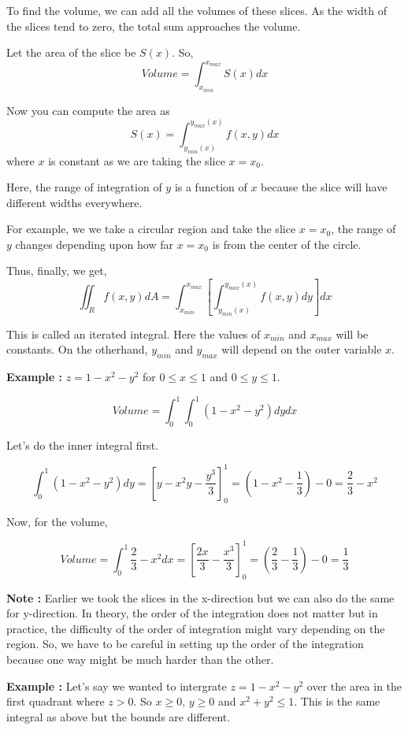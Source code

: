 To find the volume, we can add all the volumes of these slices.
As the width of the slices tend to zero, the total sum approaches the volume.

Let the area of the slice be $S(x)$. So, $$ Volume =  \int_{x_{min}}^{x_{max}} S(x) dx $$

Now you can compute the area as $$ S(x) = \int_{y_{min}(x)}^{y_{max}(x)} f(x, y) dx $$ where $x$ is constant as we are taking the slice $x = x_0$.

Here, the range of integration of $y$ is a function of $x$ because the slice will have different widths everywhere.

For example, we we take a circular region and take the slice $x = x_0$, the range of $y$ changes depending upon how far $x = x_0$ is from the center of the circle.

Thus, finally, we get,
$$ \iint_R f(x, y) dA = \int_{x_{min}}^{x_{max}} \left[ \int_{y_{min}(x)}^{y_{max}(x)} f(x, y) dy  \right] dx $$

This is called an iterated integral. Here the values of $x_{min}$ and $x_{max}$ will be constants.
On the otherhand, $y_{min}$ and $y_{max}$ will depend on the outer variable $x$.


{\bf Example : } $z = 1 - x^2 - y^2$ for $0 \leq x \leq 1$ and $0 \leq y \leq 1$.

$$Volume = \int_0^1 \int_0^1 (1 - x^2 - y^2) dy dx$$

Let's do the inner integral first.

$$ \int_0^1 (1-x^2-y^2) dy 
    = \left[ y - x^2y - \frac{y^3}{3} \right]_0^1 
    = \left( 1 - x^2 - \frac{1}{3} \right) - 0 = \frac{2}{3} - x^2
$$

Now, for the volume,

$$ Volume = \int_0^1 \frac{2}{3} - x^2 dx 
    = \left[ \frac{2x}{3} - \frac{x^3}{3} \right]_0^1 
    = \left( \frac{2}{3} - \frac{1}{3} \right) - 0 = \frac{1}{3}
$$


{\bf Note : }
Earlier we took the slices in the x-direction but we can also do the same for y-direction. 
In theory, the order of the integration does not matter but in practice, the difficulty of the order of integration might vary depending on the region.
So, we have to be careful in setting up the order of the integration because one way might be much harder than the other.

\pagebreak

{\bf Example : }
Let's say we wanted to intergrate $z = 1 - x^2 - y^2$ over the area in the first quadrant where $z > 0$.
So $x \geq 0$, $y \geq 0$ and $x^2 + y^2 \leq 1$. This is the same integral as above but the bounds are different.

